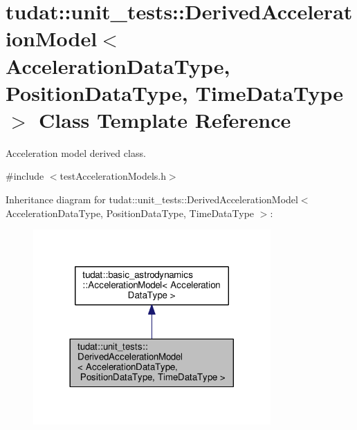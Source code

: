 \hypertarget{classtudat_1_1unit__tests_1_1DerivedAccelerationModel}{}\section{tudat\+:\+:unit\+\_\+tests\+:\+:Derived\+Acceleration\+Model$<$ Acceleration\+Data\+Type, Position\+Data\+Type, Time\+Data\+Type $>$ Class Template Reference}
\label{classtudat_1_1unit__tests_1_1DerivedAccelerationModel}


Acceleration model derived class.  




{\ttfamily \#include $<$test\+Acceleration\+Models.\+h$>$}



Inheritance diagram for tudat\+:\+:unit\+\_\+tests\+:\+:Derived\+Acceleration\+Model$<$ Acceleration\+Data\+Type, Position\+Data\+Type, Time\+Data\+Type $>$\+:
\nopagebreak
\begin{figure}[H]
\begin{center}
\leavevmode
\includegraphics[width=257pt]{classtudat_1_1unit__tests_1_1DerivedAccelerationModel__inherit__graph}
\end{center}
\end{figure}


